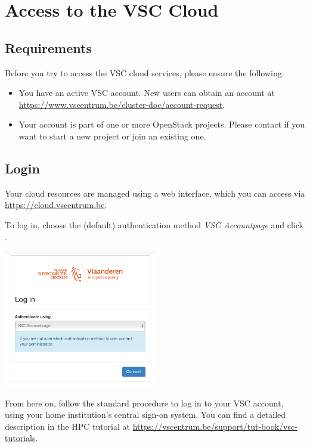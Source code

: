 \chapter{Access to the VSC Cloud}
\section{Requirements}\label{sec:requirements}
Before you try to access the VSC cloud services, please ensure the following:
\begin{itemize}
\item You have an active VSC account.  New users can obtain an account
  at \url{https://www.vscentrum.be/cluster-doc/account-request}.
\item Your account is part of one or more OpenStack projects.  Please
  contact \cloudinfo if you want to start a new project or join an
  existing one.
\end{itemize}

\section{Login}\label{sec:access}
Your cloud resources are managed using a web interface, which you can access via \url{https://cloud.vscentrum.be}.

To log in, choose the (default) authentication method \emph{VSC Accountpage} and click .
\begin{center}
\includegraphics[width=0.5\textwidth]{img/cloud_login_1.png}
\end{center}

From here on, follow the standard procedure to log in to your VSC account, using your home institution's central sign-on system.  You can find a detailed description in the HPC tutorial at \url{https://vscentrum.be/support/tut-book/vsc-tutorials}.

